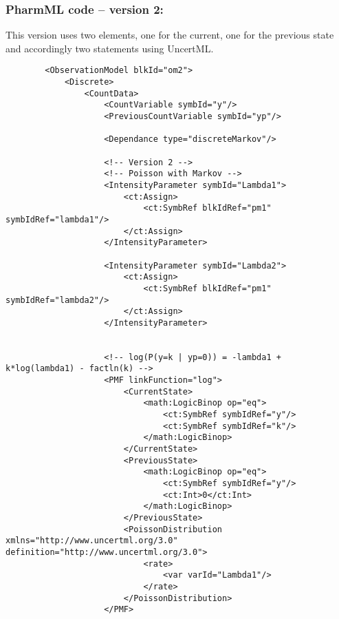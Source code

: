 \subsubsection{PharmML code -- version 2:}
This version uses two  elements, one for the current, one
for the previous state and accordingly two  statements using UncertML.
\lstset{language=XML}
\begin{lstlisting}	
        <ObservationModel blkId="om2">
            <Discrete>
                <CountData>
                    <CountVariable symbId="y"/>
                    <PreviousCountVariable symbId="yp"/>
                    
                    <Dependance type="discreteMarkov"/>
                    
                    <!-- Version 2 -->
                    <!-- Poisson with Markov -->
                    <IntensityParameter symbId="Lambda1">
                        <ct:Assign>
                            <ct:SymbRef blkIdRef="pm1" symbIdRef="lambda1"/>
                        </ct:Assign>
                    </IntensityParameter>
                    
                    <IntensityParameter symbId="Lambda2">
                        <ct:Assign>
                            <ct:SymbRef blkIdRef="pm1" symbIdRef="lambda2"/>
                        </ct:Assign>
                    </IntensityParameter>
                    
                    
                    <!-- log(P(y=k | yp=0)) = -lambda1 + k*log(lambda1) - factln(k) -->
                    <PMF linkFunction="log">
                        <CurrentState>
                            <math:LogicBinop op="eq">
                                <ct:SymbRef symbIdRef="y"/>
                                <ct:SymbRef symbIdRef="k"/>
                            </math:LogicBinop>                            
                        </CurrentState>
                        <PreviousState>
                            <math:LogicBinop op="eq">
                                <ct:SymbRef symbIdRef="y"/>
                                <ct:Int>0</ct:Int>
                            </math:LogicBinop>
                        </PreviousState>
                        <PoissonDistribution xmlns="http://www.uncertml.org/3.0" definition="http://www.uncertml.org/3.0">
                            <rate>
                                <var varId="Lambda1"/>
                            </rate>
                        </PoissonDistribution>
                    </PMF>
                    

\end{lstlisting}
